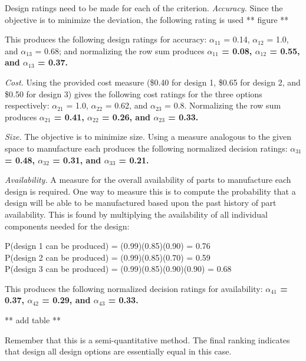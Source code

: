 \begin{enumerate}
\begin{onlysolution}
    Design ratings need to be made for each of the criterion.
    \textit{Accuracy.} Since the objective is to minimize the deviation, 
    the following rating is used 
      ** figure ** 
    
    This produces the following design ratings for accuracy: $\alpha_{11}$ = 0.14, $\alpha_{12}$ = 1.0, 
    and $\alpha_{13}$ = 0.68; and normalizing the row sum produces \textbf{$\alpha_{11}$ = 0.08, $\alpha_{12}$ = 0.55, 
    and $\alpha_{13}$ = 0.37.}

    \textit{Cost.} Using the provided cost measure (\$0.40 for design 1, \$0.65 for design 
    2, and \$0.50 for design 3) gives the following cost ratings for the three options 
    respectively: $\alpha_{21}$ = 1.0, $\alpha_{22}$ = 0.62, and $\alpha_{23}$ = 0.8. Normalizing the row sum produces 
    \textbf{$\alpha_{21}$ = 0.41, $\alpha_{22}$ = 0.26, and $\alpha_{23}$ = 0.33.}

    \textit{Size.} The objective is to minimize size. Using a measure analogous to the given 
    space to manufacture each produces the following normalized decision ratings: 
    \textbf{$\alpha_{31}$ = 0.48, $\alpha_{32}$ = 0.31, and $\alpha_{33}$ = 0.21.}

    \textit{Availability.} A measure for the overall availability of parts to manufacture 
    each design is required. One way to measure this is to compute the probability that a 
    design will be able to be manufactured based upon the past history of part availability. 
    This is found by multiplying the availability of all individual components needed for 
    the design:

      P(design 1 can be produced) = (0.99)(0.85)(0.90) = 0.76\\
      P(design 2 can be produced) = (0.99)(0.85)(0.70) = 0.59\\
      P(design 3 can be produced) = (0.99)(0.85)(0.90)(0.90) = 0.68



    This produces the following normalized decision ratings for availability: 
    \textbf{$\alpha_{41}$ = 0.37, $\alpha_{42}$ = 0.29, and $\alpha_{43}$ = 0.33.}

      ** add table **

    Remember that this is a semi-quantitative method. The final ranking indicates that design 
    all design options are essentially equal in this case.


\end{onlysolution}
\end{enumerate}
